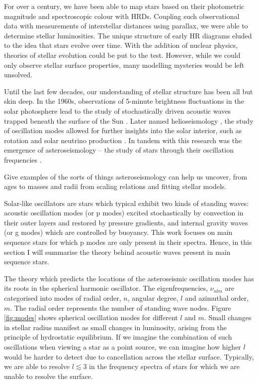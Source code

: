 For over a century, we have been able to map stars based on their photometric magnitude and spectroscopic colour with HRDs. Coupling such observational data with measurements of interstellar distances using parallax, we were able to determine stellar luminosities. The unique structure of early HR diagrams eluded to the idea that stars evolve over time. With the addition of nuclear physics, theories of stellar evolution could be put to the test. However, while we could only observe stellar surface properties, many modelling mysteries would be left unsolved.

Until the last few decades, our understanding of stellar structure has been all but skin deep. In the 1960s, observations of 5-minute brightness fluctuations in the solar photosphere lead to the study of stochastically driven acoustic waves trapped beneath the surface of the Sun \citep{Ulrich1970, Ando.Osaki1975}. Later named helioseismology \citep{Deubner.Gough1984}, the study of oscillation modes allowed for further insights into the solar interior, such as rotation \citep{Deubner.Ulrich.ea1979} and solar neutrino production \citep{Bahcall.Ulrich1988}. In tandem with this research was the emergence of asteroseismology -- the study of stars through their oscillation frequencies \citep{Christensen-Dalsgaard1984}.

Give examples of the sorts of things asteroseismology can help us uncover, from ages \citep[see, e.g.]{Ulrich1986, Soderblom2010, SilvaAguirre.Davies.ea2015} to masses and radii from scaling relations \citep{} and fitting stellar models\citep{}.

Solar-like oscillators are stars which typical exhibit two kinds of standing waves: acoustic oscillation modes (or p modes) excited stochastically by convection in their outer layers and restored by pressure gradients, and internal gravity waves (or g modes) which are controlled by buoyancy. This work focuses on main sequence stars for which p modes are only present in their spectra. Hence, in this section I will summarise the theory behind acoustic waves present in main sequence stars.

The theory which predicts the locations of the asteroseismic oscillation modes has its roots in the spherical harmonic oscillator. The eigenfrequencies, $\nu_{nlm}$ are categorised into modes of radial order, $n$, angular degree, $l$ and azimuthal order, $m$. The radial order represents the number of standing wave nodes. Figure \ref{fig:modes} shows spherical oscillation modes for different $l$ and $m$. Small changes in stellar radius manifest as small changes in luminosity, arising from the principle of hydrostatic equilibrium. If we imagine the combination of such oscillations when viewing a star as a point source, we can imagine how higher $l$ would be harder to detect due to cancellation across the stellar surface. Typically, we are able to resolve $l \lesssim 3$ in the frequency spectra of stars for which we are unable to resolve the surface.

